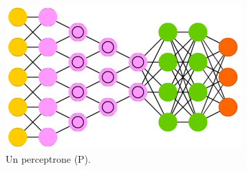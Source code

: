 \begin{figure}

\includegraphics[scale=0.8]{media_tesi/DCN.png}
\caption{Un perceptrone (P).}\label{wrap-fig:1}
\end{figure} 
